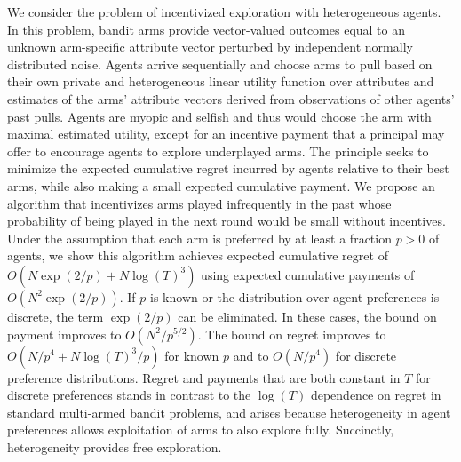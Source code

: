We consider the problem of incentivized exploration with heterogeneous agents.
In this problem, bandit arms provide vector-valued outcomes equal to an unknown
arm-specific attribute vector perturbed by independent normally distributed
noise.  Agents arrive sequentially and choose arms to pull based on their own
private and heterogeneous linear utility function over attributes and estimates
of the arms' attribute vectors derived from observations of other agents' past
pulls.  Agents are myopic and selfish and thus would choose the arm with
maximal estimated utility, except for an incentive payment that a principal may
offer to encourage agents to explore underplayed arms.  The principle seeks to
minimize the expected cumulative regret incurred by agents relative to their
best arms, while also making a small expected cumulative payment.  We propose
an algorithm that incentivizes arms played infrequently in the
past whose probability of being played in the next round would be small
without incentives.  Under the assumption that each arm is preferred by at
least a fraction $p>0$ of agents, we show this algorithm achieves expected
cumulative regret of $O(N\exp(2/p) + N \log(T)^3)$ using expected cumulative
payments of $O(N^2 \exp(2/p))$.  If $p$ is known or the distribution over agent
preferences is discrete, the term $\exp(2/p)$ can be eliminated.  In these
cases, the bound on payment improves to $O(N^2 / p^{5/2})$.  The bound on
regret improves to $O(N/p^4 + N \log(T)^3 / p)$ for known $p$ and to
$O(N/p^4)$ for discrete preference distributions.  Regret and
payments that are both constant in $T$ for discrete preferences stands
in contrast to the $\log(T)$ dependence on regret in standard multi-armed bandit
problems, and arises because heterogeneity in agent preferences allows
exploitation of arms to also explore fully.
Succinctly, heterogeneity provides free exploration.
